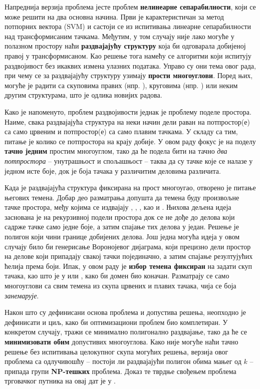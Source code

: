 \documentclass[a4paper]{article}
\begin{document}
Напреднија верзија проблема јесте проблем \textbf{нелинеарне сепарабилности}, који се може решити на два основна начина. Први је карактеристичан за метод потпорних вектора (SVM) и састоји се из испитивања линеарне сепарабилности над трансформисаним тачкама. Међутим, у том случају није лако могуће у полазном простору наћи \textbf{раздвајајућу структуру} која би одговарала добијеној правој у трансформисаном. Као решење тога намећу се алгоритми који испитују раздвојивост без икаквих измена улазних података. Управо су они тема овог рада, при чему се за раздвајајућу структуру узимају \textbf{прости многоуглови}. Поред њих, могуће је радити са скуповима правих (нпр. \cite{bonnet}), круговима (нпр. \cite{cheung}) или неким другим структурама, што је одлика новијих радова.

Како је напоменуто, проблем раздвојивости једнак је проблему поделе простора. Наиме, свака раздвајајућа структура на неки начин дели раван на потпростор(е) са само црвеним и потпростор(е) са само плавим тачкама. У складу са тим, питање је колико се потпростора на крају добије. У овом раду фокус је на поделу \textbf{тачно једним} простим многоуглом, тако да ће подела бити на тачно \textit{два потпростора} -- унутрашњост и спољашњост -- таква да су тачке које се налазе у једном исте боје, док је боја тачака у различитим деловима различита.

Када је раздвајајућа структура фиксирана на прост многоугао, отворено је питање његових темена. Добар део разматрања допушта да темена буду произвољне тачке простора, међу којима се издвајају \cite{mitch}, \cite{mata}, \cite{arora}, као и \cite{gud}. Њихова дељена идеја заснована је на рекурзивној подели простора док се не дође до делова који садрже тачке само једне боје, а затим спајање тих делова у један. Решење је полигон који чини границе добијених делова. Још једна могућа идеја у овом случају било би генерисање Воронојевог дијаграма, који прецизно дели простор на делове који припадају свакој тачки појединачно, а затим спајање  резултујућих ћелија према боји. Ипак, у овом раду је \textbf{избор темена фиксиран} на задати скуп тачака, као што је у \cite{eades} или \cite{edels}, како би домен био коначан. Разматрају се само многоуглови са свим темена из скупа црвених и плавих тачака, чија се боја \textit{занемарује}.

Након што су дефинисани основа проблема и допустива решења, неопходно је дефинисати и циљ, како би оптимизациони проблем био комплетиран. У конкретом случају, тражи се минимално полигонално раздвајање, тако да ће се \textbf{минимизовати обим} допустивих многоуглова. Како није могуће наћи тачно решење без испитивања целокупног скупа могућих решења, верзија овог проблема са одлучивошћу -- постоји ли раздвајајући полигон обима мањег од $k$ -- припада групи \textbf{NP-тешких} проблема. Доказ те тврдње свођењем проблема трговачког путника на овај дат је у \cite{eades}.
\end{document}
